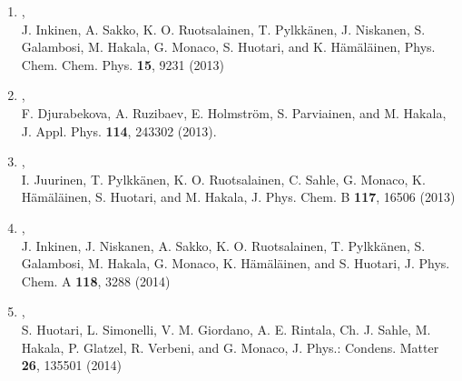 \documentclass[12pt,a4]{report}
\begin{document}
\begin{enumerate}
\item{}, \\J. Inkinen, A. Sakko, K. O. Ruotsalainen, T. Pylkk{\"a}nen, J. Niskanen, S. Galambosi, M. Hakala, G. Monaco, S. Huotari, and K. H{\"a}m{\"a}l{\"a}inen, Phys. Chem. Chem. Phys. {\bf 15}, 9231 (2013) 

\item{},\\
F. Djurabekova, A. Ruzibaev, E. Holmstr\"om, S. Parviainen, and M. Hakala, J. Appl. Phys. {\bf 114}, 243302 (2013).

\item{},\\I. Juurinen, T. Pylkk\"anen, K. O. Ruotsalainen, C. Sahle, G. Monaco, K. H{\"a}m{\"a}l{\"a}inen, S. Huotari, and M. Hakala,  J. Phys. Chem. B {\bf 117}, 16506 (2013)



\item{},\\ 
J. Inkinen, J. Niskanen, A. Sakko, K. O. Ruotsalainen, T. Pylkk{\"a}nen, S. Galambosi, M. Hakala, G. Monaco, K. H{\"a}m{\"a}l{\"a}inen, and S. Huotari, 
J. Phys. Chem. A {\bf 118}, 3288 (2014)

\item{},\\
S. Huotari, L. Simonelli, V. M. Giordano, A. E. Rintala, Ch. J. Sahle, M. Hakala, P. Glatzel, R. Verbeni, and G. Monaco,
J. Phys.: Condens. Matter {\bf 26}, 135501 (2014)



\end{enumerate}
\end{document}
